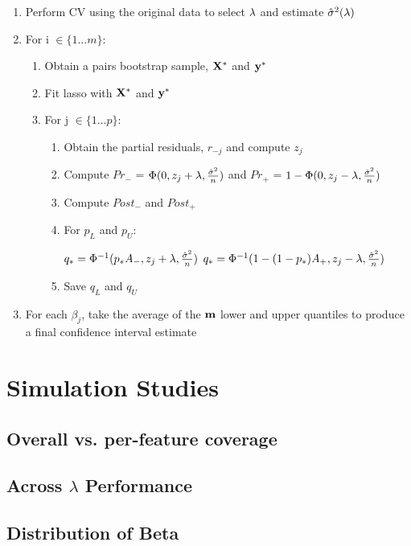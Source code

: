 \begin{enumerate}
\item Perform CV using the original data to select $\lambda$ and estimate $\hat{\sigma}^2(\lambda)$
\item For i $\in \lbrace 1 \ldots m \rbrace$:
\begin{enumerate}
\item Obtain a pairs bootstrap sample, $\mathbf{X}^*$ and $\mathbf{y}^*$
\item Fit lasso with $\mathbf{X}^*$ and $\mathbf{y}^*$
\item For j $\in \lbrace 1 \ldots p \rbrace$:
	\begin{enumerate}
	\item Obtain the partial residuals, $r_{-j}$ and compute $z_j$
	\item Compute $Pr_{-}$ = $\Phi(0, z_j + \lambda, \frac{\hat{\sigma}^2}{n})$ and $Pr_{+}$ = $1 - \Phi(0, z_j - \lambda, \frac{\hat{\sigma}^2}{n})$
	\item Compute $Post_-$ and $Post_+$
	\item For $p_L$ and $p_U$:
	\begin{algorithmic}
			\State $q_* = \Phi^{-1}(p_* A_{-}, z_j + \lambda, \frac{\hat{\sigma}^2}{n})$
		\Else
			\State $q_* = \Phi^{-1}(1 - (1 - p_*)A_{+}, z_j - \lambda, \frac{\hat{\sigma}^2}{n})$
		\EndIf
	\end{algorithmic}
	\item Save $q_L$ and $q_U$
	\end{enumerate}
\end{enumerate}
\item For each $\beta_j$, take the average of the $\mathbf{m}$ lower and upper quantiles to produce a final confidence interval estimate
\end{enumerate}

\section{Simulation Studies}

\subsection{Overall vs. per-feature coverage}

\subsection{Across \texorpdfstring{$\lambda$}{lambda} Performance}

\subsection{Distribution of Beta}

